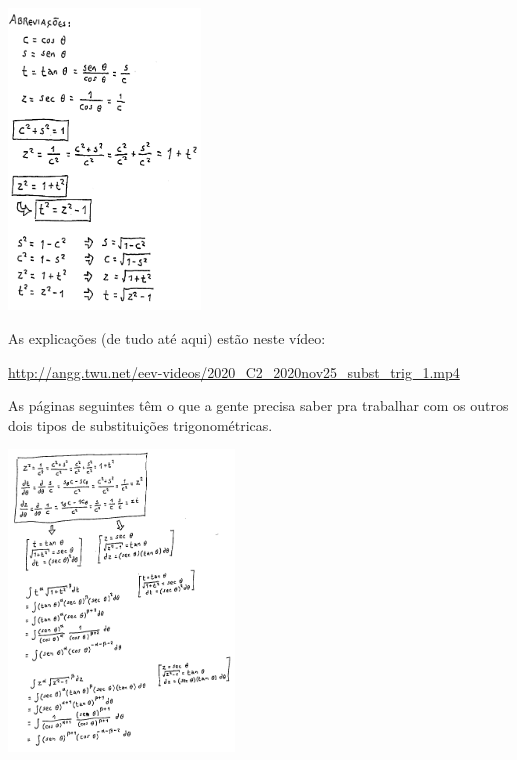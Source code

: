 \documentclass[oneside,12pt]{article}
\begin{document}
\includegraphics[height=8cm]{2020-1-C2/20201125_160249_abreviacoes.pdf}

\newpage

As explicações (de tudo até aqui) estão neste vídeo:

\ssk

\url{http://angg.twu.net/eev-videos/2020_C2_2020nov25_subst_trig_1.mp4}

\bsk
\bsk

As páginas seguintes têm o que a gente precisa saber pra trabalhar com
os outros dois tipos de substituições trigonométricas. 


\newpage


\includegraphics[height=8cm]{2020-1-C2/20201202_substtrig_grande.pdf}
\end{document}
